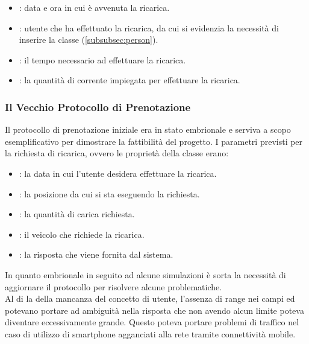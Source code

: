 \begin{itemize}
	\item {}: data e ora in cui è avvenuta la ricarica.
	\item {}: utente che ha effettuato la ricarica, da cui si evidenzia la necessità di inserire la classe  (\ref{subsubsec:person}).
	\item {}: il tempo necessario ad effettuare la ricarica.
	\item {}: la quantità di corrente impiegata per effettuare la ricarica.
\end{itemize}

\subsubsection{Il Vecchio Protocollo di Prenotazione}\label{subsubsec:old-proto}

Il protocollo di prenotazione iniziale era in stato embrionale e serviva a scopo esemplificativo per dimostrare la fattibilità del progetto. I parametri previsti per la richiesta di ricarica, ovvero le proprietà della classe  erano:

\begin{itemize}
	\item {}: la data in cui l'utente desidera effettuare la ricarica.
	\item {}: la posizione da cui si sta eseguendo la richiesta.
	\item {}: la quantità di carica richiesta. 
	\item {}: il veicolo che richiede la ricarica.
	\item {}: la risposta che viene fornita dal sistema.
\end{itemize}

\noindent
In quanto embrionale in seguito ad alcune simulazioni è sorta la necessità di aggiornare il protocollo per risolvere alcune problematiche. \\ 
Al di la della mancanza del concetto di utente, l'assenza di range nei campi  ed  potevano portare ad ambiguità nella risposta che non avendo alcun limite poteva diventare eccessivamente grande. Questo poteva portare problemi di traffico nel caso di utilizzo di smartphone agganciati alla rete tramite connettività mobile.

